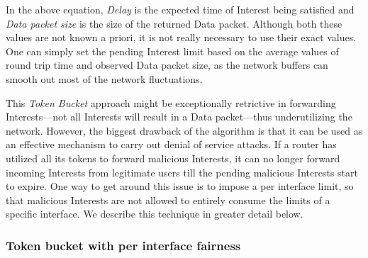 In the above equation, \emph{Delay} is the expected time of Interest being satisfied and \emph{Data packet size} is the size of the returned Data packet.
Although both these values are not known a priori, it is not really necessary to use their exact values.
One can simply set the pending Interest limit based on the average values of round trip time and observed Data packet size, as the network buffers can smooth out most of the network fluctuations.

This {\it Token Bucket} approach might be exceptionally retrictive in forwarding Interests---not all Interests will result in a Data packet---thus underutilizing the network. However, the biggest drawback of the algorithm is that it can be used as an effective mechanism to carry out denial of service attacks. If a router has utilized all its tokens to forward malicious Interests, it can no longer forward incoming Interests from legitimate users till the pending malicious Interests start to expire. One way to get around this issue is to impose a per interface limit, so that malicious Interests are not allowed to entirely consume the limits of a specific interface. We describe this technique in greater detail below.

%
%
%


\subsubsection{\textbf{Token bucket with per interface fairness}}
\label{sec:queuing}


